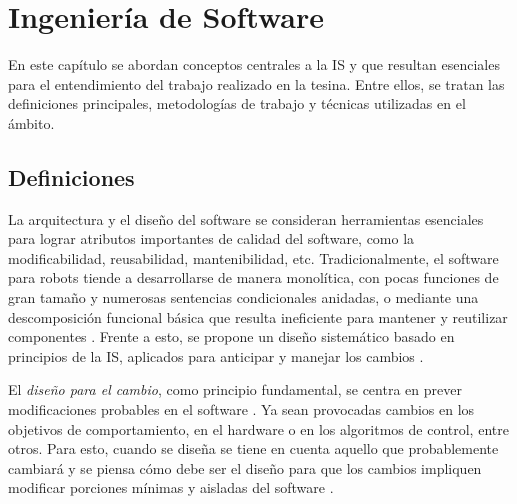 %
%


\chapter{Ingeniería de Software}
\label{ingso}

En este capítulo se abordan conceptos centrales a la \gls{IS} y que resultan esenciales para el entendimiento del trabajo realizado en la tesina. Entre ellos, se tratan las definiciones principales, metodologías de trabajo y técnicas utilizadas en el ámbito.

\section{Definiciones}

La arquitectura y el diseño del software se consideran herramientas esenciales para lograr atributos importantes de calidad del software, como la modificabilidad, reusabilidad, mantenibilidad, etc.\cite{ShawGarlan1996, ghezzi2003, bass2003, DBLP:books/daglib/0030743}
Tradicionalmente, el software para robots tiende a desarrollarse de manera monolítica, con pocas funciones de gran tamaño y numerosas sentencias condicionales anidadas, o mediante una descomposición funcional básica que resulta ineficiente para mantener y reutilizar componentes \cite{code-1,code-2}. Frente a esto, se propone un diseño sistemático basado en principios de la \gls{IS}, aplicados para anticipar y manejar los cambios \cite{Gamma:1995:DPE:186897, DBLP:books/lib/BuschmannHS07}.

El \textit{diseño para el cambio}, como principio fundamental, se centra en prever modificaciones probables en el software \cite{Parnas1972, ShawGarlan1996, ghezzi2003, bass2003, DBLP:books/daglib/0030743}. Ya sean provocadas cambios en los objetivos de comportamiento, en el hardware o en los algoritmos de control, entre otros. Para esto, cuando se diseña se tiene en cuenta aquello que probablemente cambiará y se piensa cómo debe ser el diseño para que los cambios impliquen modificar porciones mínimas y aisladas del software \cite{ghezzi2003}.

